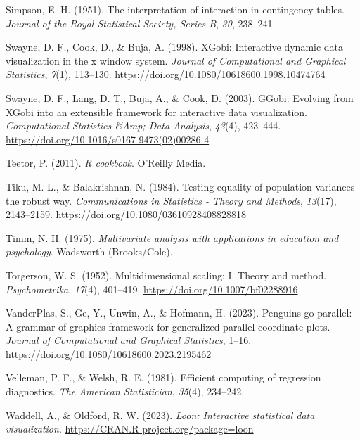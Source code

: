\documentclass[
  letterpaper,
  10pt,
  krantz2]{krantz}
\newlength{\cslhangindent}
\newenvironment{CSLReferences}[2] %
 {\begin{list}{}{%
  \setlength{\itemindent}{0pt}
  \setlength{\leftmargin}{0pt}
  \setlength{\parsep}{0pt}
  \ifodd #1
   \setlength{\leftmargin}{\cslhangindent}
   \setlength{\itemindent}{-1\cslhangindent}
  \fi
  \setlength{\itemsep}{#2\baselineskip}}}
 {\end{list}}
\begin{document}
{\begin{CSLReferences}{1}{0}
Simpson, E. H. (1951). The interpretation of interaction in contingency
tables. \emph{Journal of the Royal Statistical Society, Series B},
\emph{30}, 238--241.

Swayne, D. F., Cook, D., \& Buja, A. (1998). XGobi: Interactive dynamic
data visualization in the x window system. \emph{Journal of
Computational and Graphical Statistics}, \emph{7}(1), 113--130.
\url{https://doi.org/10.1080/10618600.1998.10474764}

Swayne, D. F., Lang, D. T., Buja, A., \& Cook, D. (2003). {GGobi}:
Evolving from {XGobi} into an extensible framework for interactive data
visualization. \emph{Computational Statistics \&Amp; Data Analysis},
\emph{43}(4), 423--444.
\url{https://doi.org/10.1016/s0167-9473(02)00286-4}

Teetor, P. (2011). \emph{{R cookbook}}. {O'Reilly} Media.

Tiku, M. L., \& Balakrishnan, N. (1984). Testing equality of population
variances the robust way. \emph{Communications in Statistics - Theory
and Methods}, \emph{13}(17), 2143--2159.
\url{https://doi.org/10.1080/03610928408828818}

Timm, N. H. (1975). \emph{Multivariate analysis with applications in
education and psychology}. Wadsworth (Brooks/Cole).

Torgerson, W. S. (1952). Multidimensional scaling: I. Theory and method.
\emph{Psychometrika}, \emph{17}(4), 401--419.
\url{https://doi.org/10.1007/bf02288916}

VanderPlas, S., Ge, Y., Unwin, A., \& Hofmann, H. (2023). Penguins go
parallel: A grammar of graphics framework for generalized parallel
coordinate plots. \emph{Journal of Computational and Graphical
Statistics}, 1--16. \url{https://doi.org/10.1080/10618600.2023.2195462}

Velleman, P. F., \& Welsh, R. E. (1981). Efficient computing of
regression diagnostics. \emph{The American Statistician}, \emph{35}(4),
234--242.

Waddell, A., \& Oldford, R. W. (2023). \emph{Loon: Interactive
statistical data visualization}.
\url{https://CRAN.R-project.org/package=loon}


\end{CSLReferences}}
\end{document}
